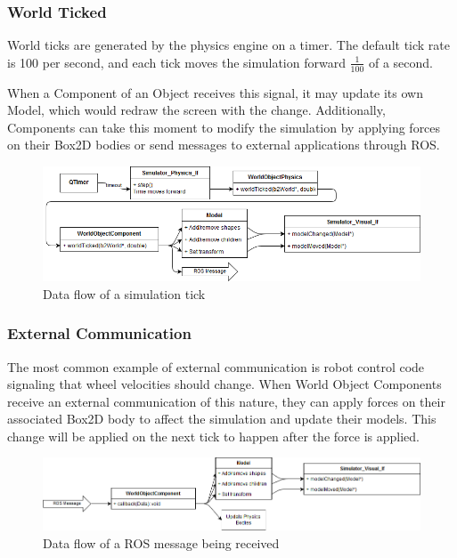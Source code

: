  \subsubsection*{World Ticked}
 World ticks are generated by the physics engine on a timer. The default tick rate is 100 per second, and each tick moves the simulation forward $\frac{1}{100}$ of a second.
 
 When a Component of an Object receives this signal, it may update its own Model, which would redraw the screen with the change. Additionally, Components can take this moment to modify the simulation by applying forces on their Box2D bodies or send messages to external applications through ROS.
 
  	\begin{figure}[h]
 		\centering
 		\includegraphics[width=\textwidth]{./images_design/uml/event_tick}
 		\caption{Data flow of a simulation tick\label{uml:tickevent}}
 	\end{figure}
 
 \subsubsection*{External Communication}
 The most common example of external communication is robot control code signaling that wheel velocities should change. When World Object Components receive an external communication of this nature, they can apply forces on their associated Box2D body to affect the simulation and update their models. This change will be applied on the next tick to happen after the force is applied.
 
  	\begin{figure}[h]
 		\centering
 		\includegraphics[width=\textwidth]{./images_design/uml/event_data}
 		\caption{Data flow of a ROS message being received\label{uml:dataevent}}
 	\end{figure}
 
